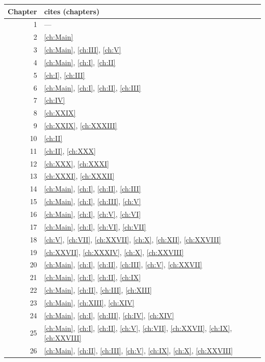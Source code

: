 \begin{center}\small
\begin{tabular}{rl}
\hline
Chapter & cites (chapters)\\
\hline
1 & ---\\
2 & \ref{ch:Main}\\
3 & \ref{ch:Main}, \ref{ch:III}, \ref{ch:V}\\
4 & \ref{ch:Main}, \ref{ch:I}, \ref{ch:II}\\
5 & \ref{ch:I}, \ref{ch:III}\\
6 & \ref{ch:Main}, \ref{ch:I}, \ref{ch:II}, \ref{ch:III}\\
7 & \ref{ch:IV}\\
8 & \ref{ch:XXIX}\\
9 & \ref{ch:XXIX}, \ref{ch:XXXIII}\\
10 & \ref{ch:II}\\
11 & \ref{ch:II}, \ref{ch:XXX}\\
12 & \ref{ch:XXX}, \ref{ch:XXXI}\\
13 & \ref{ch:XXXI}, \ref{ch:XXXII}\\
14 & \ref{ch:Main}, \ref{ch:I}, \ref{ch:II}, \ref{ch:III}\\
15 & \ref{ch:Main}, \ref{ch:I}, \ref{ch:III}, \ref{ch:V}\\
16 & \ref{ch:Main}, \ref{ch:I}, \ref{ch:V}, \ref{ch:VI}\\
17 & \ref{ch:Main}, \ref{ch:I}, \ref{ch:VI}, \ref{ch:VII}\\
18 & \ref{ch:V}, \ref{ch:VII}, \ref{ch:XXVII}, \ref{ch:X}, \ref{ch:XII}, \ref{ch:XXVIII}\\
19 & \ref{ch:XXVII}, \ref{ch:XXXIV}, \ref{ch:X}, \ref{ch:XXVIII}\\
20 & \ref{ch:Main}, \ref{ch:I}, \ref{ch:II}, \ref{ch:III}, \ref{ch:V}, \ref{ch:XXVII}\\
21 & \ref{ch:Main}, \ref{ch:I}, \ref{ch:II}, \ref{ch:IX}\\
22 & \ref{ch:Main}, \ref{ch:II}, \ref{ch:III}, \ref{ch:XIII}\\
23 & \ref{ch:Main}, \ref{ch:XIII}, \ref{ch:XIV}\\
24 & \ref{ch:Main}, \ref{ch:I}, \ref{ch:III}, \ref{ch:IV}, \ref{ch:XIV}\\
25 & \ref{ch:Main}, \ref{ch:I}, \ref{ch:II}, \ref{ch:V}, \ref{ch:VII}, \ref{ch:XXVII}, \ref{ch:IX}, \ref{ch:XXVIII}\\
26 & \ref{ch:Main}, \ref{ch:II}, \ref{ch:III}, \ref{ch:V}, \ref{ch:IX}, \ref{ch:X}, \ref{ch:XXVIII}\\

\end{tabular}
\end{center}
